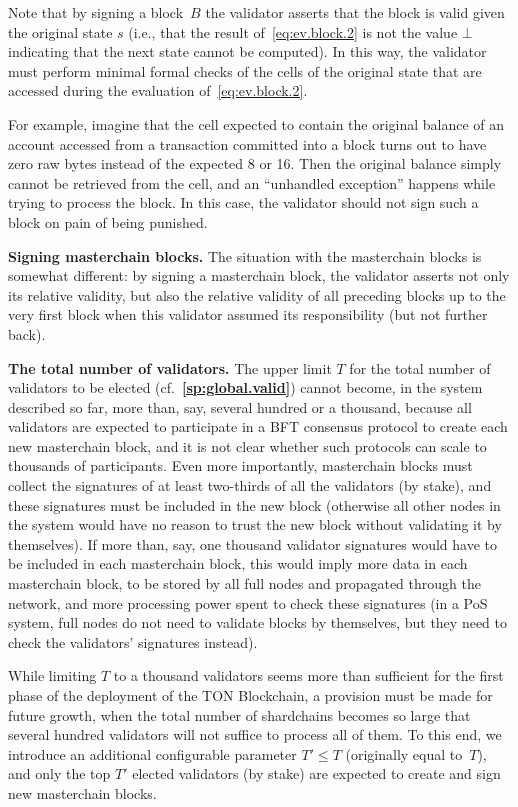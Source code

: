 \documentclass[12pt,oneside]{article}
\def\makepoint#1{\medbreak\noindent{\bf #1.\ }}
\def\nxsubpoint{\refstepcounter{subsubsection}%
  \smallbreak\makepoint{\thesubsubsection}}
\def\refpoint#1{{\rm\textbf{\ref{#1}}}}
\let\ptref=\refpoint
\def\embt(#1.){\textbf{#1.}}
\begin{document}
Note that by signing a block~$B$ the validator asserts that the block
is valid given the original state $s$ (i.e., that the result
of~\eqref{eq:ev.block.2} is not the value $\bot$ indicating that the
next state cannot be computed). In this way, the validator must
perform minimal formal checks of the cells of the original state that
are accessed during the evaluation of~\eqref{eq:ev.block.2}.

For example, imagine that the cell expected to contain the original
balance of an account accessed from a transaction committed into a
block turns out to have zero raw bytes instead of the expected 8 or
16. Then the original balance simply cannot be retrieved from the
cell, and an ``unhandled exception'' happens while trying to process
the block. In this case, the validator should not sign such a block on
pain of being punished.

\nxsubpoint \embt(Signing masterchain blocks.)  The situation with the
masterchain blocks is somewhat different: by signing a masterchain
block, the validator asserts not only its relative validity, but also
the relative validity of all preceding blocks up to the very first
block when this validator assumed its responsibility (but not further
back).

\nxsubpoint \embt(The total number of validators.)  The upper
limit $T$ for the total number of validators to be elected
(cf.~\ptref{sp:global.valid}) cannot become, in the system described
so far, more than, say, several hundred or a thousand, because all
validators are expected to participate in a BFT consensus protocol to
create each new masterchain block, and it is not clear whether such
protocols can scale to thousands of participants. Even more
importantly, masterchain blocks must collect the signatures of at
least two-thirds of all the validators (by stake), and these
signatures must be included in the new block (otherwise all other
nodes in the system would have no reason to trust the new block
without validating it by themselves). If more than, say, one thousand
validator signatures would have to be included in each masterchain
block, this would imply more data in each masterchain block, to be
stored by all full nodes and propagated through the network, and more
processing power spent to check these signatures (in a PoS system,
full nodes do not need to validate blocks by themselves, but they need
to check the validators' signatures instead).

While limiting $T$ to a thousand validators seems more than sufficient
for the first phase of the deployment of the TON Blockchain, a
provision must be made for future growth, when the total number of
shardchains becomes so large that several hundred validators will not
suffice to process all of them. To this end, we introduce an
additional configurable parameter $T'\leq T$ (originally equal
to~$T$), and only the top $T'$ elected validators (by stake) are
expected to create and sign new masterchain blocks.
\end{document}
